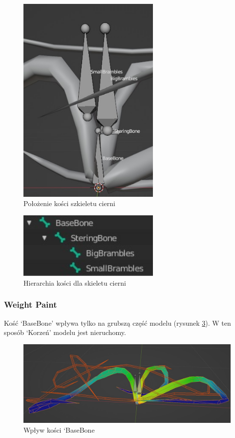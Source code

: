 \documentclass[12pt,twoside]{article}
\begin{document}
\begin{figure}[ht!]
    \centering
    \includegraphics[width=7cm]{RealizacjaProjektu/Thorns/BrambleArmature.jpg}
    \caption{Położenie kości szkieletu cierni}
    \label{Bramble:Aramature}
\end{figure}
\begin{figure}[ht!]
    \centering
    \includegraphics[width=7cm]{RealizacjaProjektu/Thorns/Bramble_ArmatrueHierarchy.jpg}
    \caption{Hierarchia kości dla skieletu cierni}
    \label{Bramble:ArmatrueHierarchy}
\end{figure}
\clearpage
\subsubsection{Weight Paint}

Kość `BaseBone' wpływa tylko na grubszą część modelu (rysunek
\ref{Bramble:WeightsRoot}). W ten sposób `Korzeń' modelu jest nieruchomy.
\begin{figure}[ht!]
    \centering
    \includegraphics[width=12cm]{RealizacjaProjektu/Thorns/bramble_weight_root.jpg}
    \caption{Wpływ kości `BaseBone}
    \label{Bramble:WeightsRoot}
\end{figure}
\end{document}
